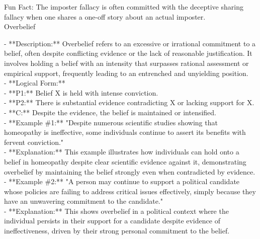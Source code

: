 \documentclass[a4paper,12pt,single,pdftex]{scrartcl}
\begin{document}
    
      Fun Fact: The imposter fallacy is often committed with the deceptive sharing fallacy when one shares a one-off story about an actual imposter.
    \\

  

Overbelief
    
      - **Description:** Overbelief refers to an excessive or irrational commitment to a belief, often despite conflicting evidence or the lack of reasonable justification. It involves holding a belief with an intensity that surpasses rational assessment or empirical support, frequently leading to an entrenched and unyielding position.
    \\

    
      - **Logical Form:**
    \\

    
        - **P1:** Belief X is held with intense conviction.
    \\

    
        - **P2:** There is substantial evidence contradicting X or lacking support for X.
    \\

    
        - **C:** Despite the evidence, the belief is maintained or intensified.
    \\

    
      - **Example \#1:** "Despite numerous scientific studies showing that homeopathy is ineffective, some individuals continue to assert its benefits with fervent conviction."
    \\

    
      - **Explanation:** This example illustrates how individuals can hold onto a belief in homeopathy despite clear scientific evidence against it, demonstrating overbelief by maintaining the belief strongly even when contradicted by evidence.
    \\

    
      - **Example \#2:** "A person may continue to support a political candidate whose policies are failing to address critical issues effectively, simply because they have an unwavering commitment to the candidate."
    \\

    
      - **Explanation:** This shows overbelief in a political context where the individual persists in their support for a candidate despite evidence of ineffectiveness, driven by their strong personal commitment to the belief.
    \\
\end{document}
